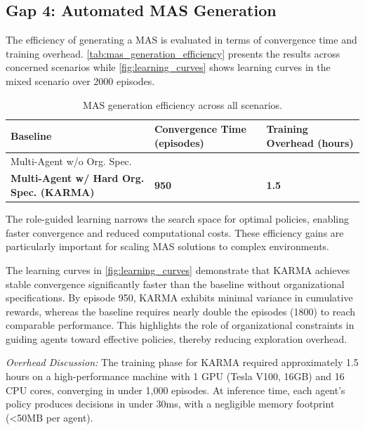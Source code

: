 \subsection{Gap 4: Automated MAS Generation}

The efficiency of generating a MAS is evaluated in terms of convergence time and training overhead. \autoref{tab:mas_generation_efficiency} presents the results across concerned scenarios while \autoref{fig:learning_curves} shows learning curves in the mixed scenario over 2000 episodes.

\begin{table}[h]
  \centering
  \caption{MAS generation efficiency across all scenarios.}
  \label{tab:mas_generation_efficiency}{
    \footnotesize
    \begin{tabular}{>{\raggedright\arraybackslash}m{3.5cm}>{\centering\arraybackslash}m{2cm}>{\centering\arraybackslash}m{2cm}}
      \hline
      \textbf{Baseline}                               & \textbf{Convergence Time (episodes)} & \textbf{Training Overhead (hours)} \\
      \hline
      Multi-Agent w/o Org. Spec.                      & 1800                                 & 4                                  \\
      \textbf{Multi-Agent w/ Hard Org. Spec. (KARMA)} & \textbf{950}                         & \textbf{1.5}                       \\
      \hline
    \end{tabular}}
\end{table}

The role-guided learning narrows the search space for optimal policies, enabling faster convergence and reduced computational costs. These efficiency gains are particularly important for scaling MAS solutions to complex environments.

The learning curves in \autoref{fig:learning_curves} demonstrate that KARMA achieves stable convergence significantly faster than the baseline without organizational specifications. By episode 950, KARMA exhibits minimal variance in cumulative rewards, whereas the baseline requires nearly double the episodes (1800) to reach comparable performance. This highlights the role of organizational constraints in guiding agents toward effective policies, thereby reducing exploration overhead.

\noindent \textit{Overhead Discussion:} The training phase for KARMA required approximately 1.5 hours on a high-performance machine with 1 GPU (Tesla V100, 16GB) and 16 CPU cores, converging in under 1,000 episodes. At inference time, each agent's policy produces decisions in under 30ms, with a negligible memory footprint (<50MB per agent).

